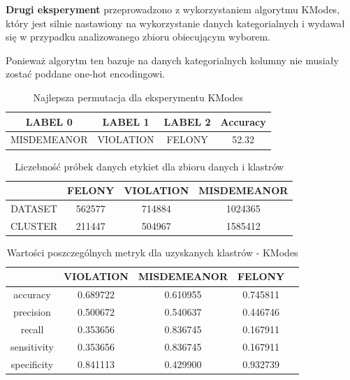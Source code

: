 \documentclass{classrep}
\begin{document}
{{{                \textbf{Drugi eksperyment} przeprowadzono z wykorzystaniem algorytmu KModes, który jest silnie nastawiony na wykorzystanie danych kategorialnych i wydawał się w przypadku analizowanego zbioru obiecującym wyborem.
                
                Ponieważ algorytm ten bazuje na danych kategorialnych kolumny nie musiały zostać poddane one-hot encodingowi.
                
                \begin{table}[!htbp]
                \centering
                \begin{tabular}{|c|c|c|c|}
                    \hline
                    LABEL 0 & LABEL 1 & LABEL 2 & Accuracy \\ \hline
                    MISDEMEANOR  & VIOLATION  & FELONY  & 52.32 \\
                    \hline
                \end{tabular}
                \caption{Najlepsza permutacja dla eksperymentu KModes}
                \label{tab:kmodes_lab}
                \end{table}
                
                \begin{table}[!htbp]
                \centering
                \begin{tabular}{|c|c|c|c|}
                    \hline
                    & FELONY  & VIOLATION  & MISDEMEANOR \\ \hline
                    DATASET & 562577 & 714884 & 1024365 \\
                    CLUSTER & 211447 & 504967 & 1585412 \\ 
                    \hline
                \end{tabular}
                \caption{Liczebność próbek danych etykiet dla zbioru danych i klastrów}
                \label{tab:kmodes_samples}
                \end{table}
                
                \begin{table}[!htbp]
                \centering
                \begin{tabular}{|c|c|c|c|c|}
                    \hline
                 & VIOLATION  &  MISDEMEANOR & FELONY \\ \hline
                accuracy      &  0.689722     & 0.610955 & 0.745811      \\
                precision   &        0.500672  &   0.540637 & 0.446746 \\
                recall       &       0.353656  &   0.836745 & 0.167911 \\
                sensitivity    &       0.353656  &   0.836745 & 0.167911   \\
                specificity   &      0.841113  &   0.429900 & 0.932739 \\
                    \hline
                \end{tabular}
                \caption{Wartości poszczególnych metryk dla uzyskanych klastrów - KModes}
                \label{tab:kmodes_metrics}
                \end{table}
                
}}}
\end{document}

